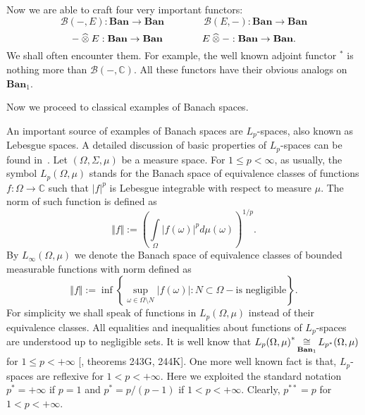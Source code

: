 Now we are able to craft four very important functors:
$$
\mathcal{B}(-,E):\mathbf{Ban}\to\mathbf{Ban}
\qquad\qquad
\mathcal{B}(E,-):\mathbf{Ban}\to\mathbf{Ban}
$$
$$
-\mathbin{\widehat{\otimes}} E:\mathbf{Ban}\to\mathbf{Ban}
\qquad\qquad
E\mathbin{\widehat{\otimes}} -:\mathbf{Ban}\to\mathbf{Ban}.
$$
We shall often encounter them. For example, the well known adjoint functor
${}^*$ is nothing more than $\mathcal{B}(-,\mathbb{C})$. All these functors have
their obvious analogs on $\mathbf{Ban}_1$.

Now we  proceed to classical examples of Banach spaces. 

An important source of examples of Banach spaces are $L_p$-spaces, also known as
Lebesgue spaces. A detailed discussion of basic properties of $L_p$-spaces can
be found in~\cite{CarothShortCourseBanSp}.  Let $(\Omega,\Sigma,\mu)$ be a
measure space.  For $1\leq p<\infty$, as usually, the symbol $L_p(\Omega,\mu)$
stands for the Banach space of equivalence classes of functions
$f:\Omega\to\mathbb{C}$ such that $|f|^p$ is Lebesgue integrable with respect to
measure $\mu$. The norm of such function is defined as
$$
\Vert f\Vert
:={\left(
  \int\limits_{\Omega}{|f(\omega)|}^p d\mu(\omega)
\right)}^{1/p}.
$$ 
By $L_\infty(\Omega,\mu)$ we denote the Banach space of equivalence classes of
bounded measurable functions with norm defined as 
$$
\Vert f\Vert:=\inf\left \{
  \sup_{\omega\in\Omega\setminus N}|f(\omega)|
  :N\subset\Omega - \mbox{is negligible}
\right \}.
$$
For simplicity we shall speak of functions in $L_p(\Omega,\mu)$ instead of their
equivalence classes. All equalities and inequalities about functions of
$L_p$-spaces are understood up to negligible sets. It is well know that
${L_p(\Omega,\mu)}^*\mathop{\mathbin{\cong}}\limits_{\mathbf{Ban}_1}L_{p^*}(\Omega,\mu)$ for 
$1\leq p<+\infty$ [\cite{FremMeasTh}, theorems 243G, 244K]. 
One more well known fact is that, $L_p$-spaces are reflexive for 
$1<p<+\infty$. Here we exploited the standard 
notation $p^*=+\infty$ if $p=1$ and $p^*=p/(p-1)$ if $1<p<+\infty$.
Clearly, $p^{**}=p$ for $1<p<+\infty$.

